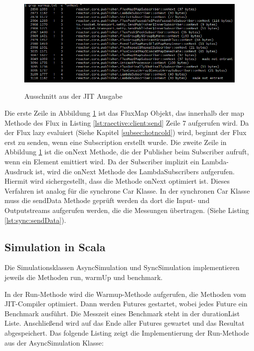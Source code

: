 \begin{center}
\begin{figure}[H]
	\caption{Ausschnitt aus der JIT Ausgabe}
	\centering
  	\includegraphics[width=\textwidth]{media/jit-output.png}
	\label{jit:output}
\end{figure}
\end{center}

Die erste Zeile in Abbildung \ref{jit:output} ist das FluxMap Objekt, das innerhalb der map Methode des Flux in Listing \ref{lst:raective:client:send} Zeile 7 aufgerufen wird. Da der Flux lazy evaluiert (Siehe Kapitel \ref{subsec:hotncold}) wird, beginnt der Flux erst zu senden, wenn eine Subscription erstellt wurde. Die zweite Zeile in Abbildung \ref{jit:output} ist die onNext Methode, die der Publisher beim Subscriber aufruft, wenn ein Element emittiert wird. Da der Subscriber implizit ein Lambda-Ausdruck ist, wird die onNext Methode des LambdaSubscribers aufgerufen. Hiermit wird sichergestellt, dass die Methode onNext optimiert ist. Dieses Verfahren ist analog für die synchrone Car Klasse. In der synchronen Car Klasse muss die sendData Methode geprüft werden da dort die Input- und Outputstreams aufgerufen werden, die die Messungen übertragen. (Siehe Listing \ref{lst:sync:sendData}).

\subsection{Simulation in Scala}
Die Simulationsklassen AsyncSimulation und SyncSimulation implementieren jeweils die Methoden run, warmUp und benchmark.

In der Run-Methode wird die Warmup-Methode aufgerufen, die Methoden vom JIT-Compiler optimiert. Dann werden Futures gestartet, wobei jedes Future ein Benchmark ausführt. Die Messzeit eines Benchmark steht in der durationList Liste. Anschließend wird auf das Ende aller Futures gewartet und das Resultat abgespeichert. Das folgende Listing zeigt die Implementierung der Run-Methode aus der AsyncSimulation Klasse:

